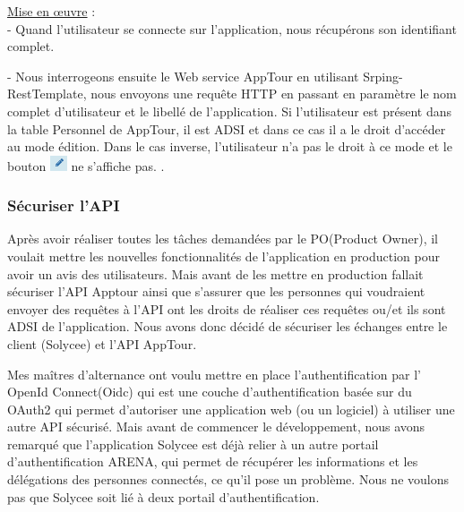 \documentclass[12pt]{article}
\begin{document}
  
\underline{Mise en œuvre} : \\
- Quand l'utilisateur se connecte sur l'application, nous récupérons son identifiant complet.

- Nous interrogeons ensuite le Web service AppTour en utilisant  Srping-RestTemplate\footnotemark, nous envoyons une requête HTTP en passant en paramètre le nom complet d'utilisateur et le libellé de l'application. Si l'utilisateur est présent dans la table Personnel de AppTour, il est ADSI et dans ce cas il a le droit d'accéder au mode édition. Dans le cas inverse, l'utilisateur n'a pas le droit à ce mode et le bouton \includegraphics[width=5mm,scale=0.5]{diagrammes/Bouton_modeEdition.png} ne s'affiche pas.
.\\


\subsubsection{Sécuriser l'API}

Après avoir réaliser toutes les tâches demandées par le PO(Product Owner), il voulait mettre les nouvelles fonctionnalités de l'application en production pour avoir un avis des utilisateurs. Mais avant de les mettre en production fallait sécuriser l'API Apptour ainsi que s'assurer que les personnes qui voudraient envoyer des requêtes à l'API ont les droits de réaliser ces requêtes ou/et ils sont ADSI de l'application. Nous avons donc décidé de sécuriser les échanges entre le client (Solycee) et l'API AppTour. 

Mes maîtres d'alternance ont voulu mettre en place l'authentification par l' OpenId Connect(Oidc) qui est une couche d'authentification basée sur du OAuth2 qui permet d'autoriser une application web (ou un logiciel) à utiliser une autre API sécurisé. Mais avant de commencer le développement, nous avons remarqué que l'application Solycee est déjà relier à un autre portail d'authentification ARENA, qui permet de récupérer les informations et les délégations des personnes connectés, ce qu'il pose un problème. Nous ne voulons pas que Solycee soit lié à deux portail d'authentification.
\end{document}
